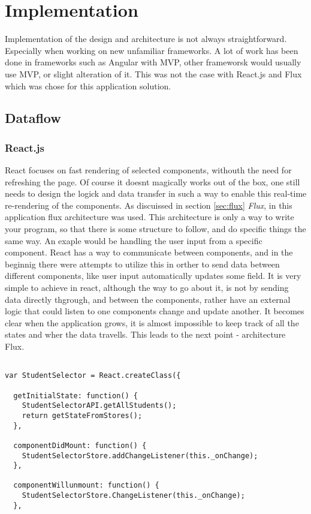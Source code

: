 \chapter{Implementation}
Implementation of the design and architecture is not always straightforward. Especially when working on new unfamiliar frameworks. A lot of work has been done in frameworks such as Angular with MVP, other frameworsk would usually use MVP, or slight alteration of it. This was not the case with React.js and Flux which was chose for this application solution.
\section{Dataflow}
\subsection{React.js}
React focuses on fast rendering of selected components, withouth the need for refreshing the page. Of course it doesnt magically works out of the box, one still needs to design the logick and data transfer in such a way to enable this real-time re-rendering of the components. As discuissed in section \ref{sec:flux} \emph{Flux}, in this application flux architecture was used. This architecture is only a way to write your program, so that there is some structure to follow, and do specific things the same way. An exaple would be handling the user input from a specific component. React has a way to communicate between components, and in the beginnig there were attempts to utilize this in orther to send data between different components, like user input automatically updates some field. It is very simple to achieve in react, although the way to go about it, is not by sending data directly thgrough, and between the components, rather have an external logic that could listen to one components change and update another. It becomes clear when the application grows, it is almost impossible to keep track of all the states and wher the data travells. This leads to the next point - architecture Flux.


\begin{lstlisting}[caption=React setup for listening to cache/data store, label=lst:componentlisteners]

var StudentSelector = React.createClass({

  getInitialState: function() {
    StudentSelectorAPI.getAllStudents();
    return getStateFromStores();
  },

  componentDidMount: function() {
    StudentSelectorStore.addChangeListener(this._onChange);
  },

  componentWillunmount: function() {
    StudentSelectorStore.ChangeListener(this._onChange);
  },

\end{lstlisting}

